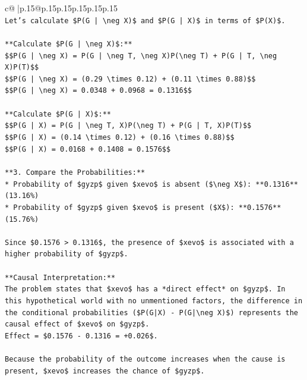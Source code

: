 \documentclass{article}
\begin{document}
{\begin{supertabular}{c@{$\;$}|p{.15\linewidth}@{}p{.15\linewidth}p{.15\linewidth}p{.15\linewidth}p{.15\linewidth}p{.15\linewidth}}
{{{\\ 
\texttt{Let's calculate \$P(G | \textbackslash{}neg X)\$ and \$P(G | X)\$ in terms of \$P(X)\$.} \\
\\ 
\texttt{**Calculate \$P(G | \textbackslash{}neg X)\$:**} \\
\texttt{\$\$P(G | \textbackslash{}neg X) = P(G | \textbackslash{}neg T, \textbackslash{}neg X)P(\textbackslash{}neg T) + P(G | T, \textbackslash{}neg X)P(T)\$\$} \\
\texttt{\$\$P(G | \textbackslash{}neg X) = (0.29 \textbackslash{}times 0.12) + (0.11 \textbackslash{}times 0.88)\$\$} \\
\texttt{\$\$P(G | \textbackslash{}neg X) = 0.0348 + 0.0968 = 0.1316\$\$} \\
\\ 
\texttt{**Calculate \$P(G | X)\$:**} \\
\texttt{\$\$P(G | X) = P(G | \textbackslash{}neg T, X)P(\textbackslash{}neg T) + P(G | T, X)P(T)\$\$} \\
\texttt{\$\$P(G | X) = (0.14 \textbackslash{}times 0.12) + (0.16 \textbackslash{}times 0.88)\$\$} \\
\texttt{\$\$P(G | X) = 0.0168 + 0.1408 = 0.1576\$\$} \\
\\ 
\texttt{**3. Compare the Probabilities:**} \\
\texttt{*   Probability of \$gyzp\$ given \$xevo\$ is absent (\$\textbackslash{}neg X\$): **0.1316** (13.16\%)} \\
\texttt{*   Probability of \$gyzp\$ given \$xevo\$ is present (\$X\$): **0.1576** (15.76\%)} \\
\\ 
\texttt{Since \$0.1576 > 0.1316\$, the presence of \$xevo\$ is associated with a higher probability of \$gyzp\$.} \\
\\ 
\texttt{**Causal Interpretation:**} \\
\texttt{The problem states that \$xevo\$ has a *direct effect* on \$gyzp\$. In this hypothetical world with no unmentioned factors, the difference in the conditional probabilities (\$P(G|X) {-} P(G|\textbackslash{}neg X)\$) represents the causal effect of \$xevo\$ on \$gyzp\$.} \\
\texttt{Effect = \$0.1576 {-} 0.1316 = +0.026\$.} \\
\\ 
\texttt{Because the probability of the outcome increases when the cause is present, \$xevo\$ increases the chance of \$gyzp\$.} \\
}}}
\end{supertabular}}
\end{document}
